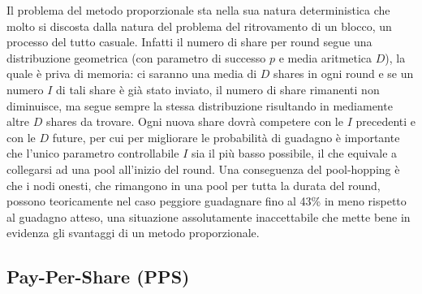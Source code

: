Il problema del metodo proporzionale sta nella sua natura deterministica che molto si discosta dalla natura del problema del ritrovamento di un blocco, un processo del tutto casuale. Infatti il numero di share per round segue una distribuzione geometrica (con parametro di successo $p$ e media aritmetica $D$), la quale è priva di memoria: ci saranno una media di $D$ shares in ogni round e se un numero $I$ di tali share è già stato inviato, il numero di share rimanenti non diminuisce, ma segue sempre la stessa distribuzione risultando in mediamente altre $D$ shares da trovare. Ogni nuova share dovrà competere con le $I$ precedenti e con le $D$ future, per cui per migliorare le probabilità di guadagno è importante che l'unico parametro controllabile $I$ sia il più basso possibile, il che equivale a collegarsi ad una pool all'inizio del round.
Una conseguenza del pool-hopping è che i nodi onesti, che rimangono in una pool per tutta la durata del round, possono teoricamente nel caso peggiore guadagnare fino al 43\% in meno rispetto al guadagno atteso, una situazione assolutamente inaccettabile che mette bene in evidenza gli svantaggi di un metodo proporzionale.

\subsection{Pay-Per-Share (PPS)}

